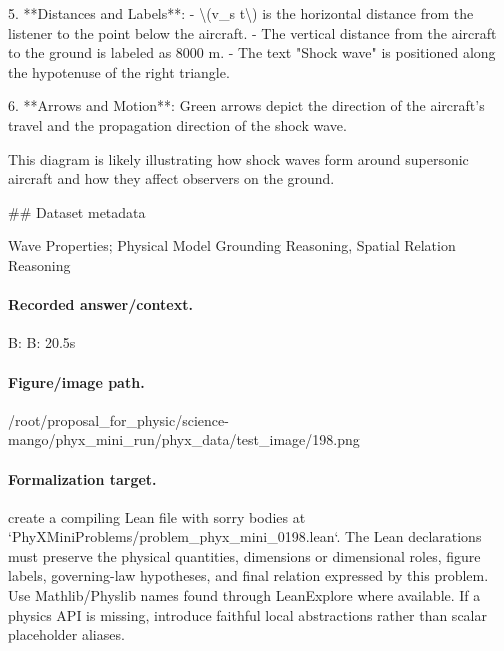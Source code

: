 5. **Distances and Labels**:
   - \textbackslash{}(v\_s t\textbackslash{}) is the horizontal distance from the listener to the point below the aircraft.
   - The vertical distance from the aircraft to the ground is labeled as 8000 m.
   - The text "Shock wave" is positioned along the hypotenuse of the right triangle.

6. **Arrows and Motion**: Green arrows depict the direction of the aircraft's travel and the propagation direction of the shock wave.

This diagram is likely illustrating how shock waves form around supersonic aircraft and how they affect observers on the ground.

\#\# Dataset metadata

Wave Properties; Physical Model Grounding Reasoning, Spatial Relation Reasoning

\paragraph{Recorded answer/context.}
B: B: 20.5s

\paragraph{Figure/image path.}
/root/proposal\_for\_physic/science-mango/phyx\_mini\_run/phyx\_data/test\_image/198.png

\paragraph{Formalization target.}
create a compiling Lean file with sorry bodies at `PhyXMiniProblems/problem\_phyx\_mini\_0198.lean`. The Lean declarations must preserve the physical quantities, dimensions or dimensional roles, figure labels, governing-law hypotheses, and final relation expressed by this problem.
Use Mathlib/Physlib names found through LeanExplore where available. If a physics API is missing, introduce faithful local abstractions rather than scalar placeholder aliases.

